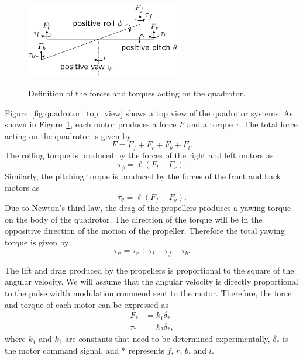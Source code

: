 {\begin{figure}[hhhhtb]
  \centering
  \includegraphics[width=0.6\textwidth]{chap3_multirotor/figures/quadrotor_define_angles}\\
  \caption{Definition of the forces and torques acting on the quadrotor.}%
  \label{fig:quadrotor_define_angles}
\end{figure}


Figure~\ref{fig:quadrotor_top_view} shows a top view of the
quadrotor systems.  As shown in
Figure~\ref{fig:quadrotor_define_angles}, each motor produces a
force $F$ and a torque $\tau$.  The total force acting on the
quadrotor is given by
\[
F = F_f + F_r + F_b + F_l.
\]
The rolling torque is produced by the forces of the right and left
motors as
\[
\tau_{\phi} = \ell(F_l - F_r).
\]
Similarly, the pitching torque is produced by the forces of the
front and back motors as
\[
\tau_{\theta} = \ell(F_f - F_b).
\]
Due to Newton's third law, the drag of the propellers produces a
yawing torque on the body of the quadrotor.  The direction of the
torque will be in the oppositive direction of the motion of the
propeller.  Therefore the total yawing torque is given by
\[
\tau_{\psi} = \tau_r + \tau_l - \tau_f - \tau_b.
\]

The lift and drag produced by the propellers is proportional to the
square of the angular velocity.  We will assume that the angular
velocity is directly proportional to the pulse width modulation
commend sent to the motor.  Therefore, the force and torque of each
motor can be expressed as
\begin{align*}
F_{\ast} &= k_1 \delta_{\ast} \\
\tau_{\ast} &= k_2 \delta_{\ast},
\end{align*}
where $k_1$ and $k_2$ are constants  that need to be determined
experimentally, $\delta_{\ast}$ is the motor command signal, and
$\ast$ represents $f$, $r$, $b$, and $l$.

}
